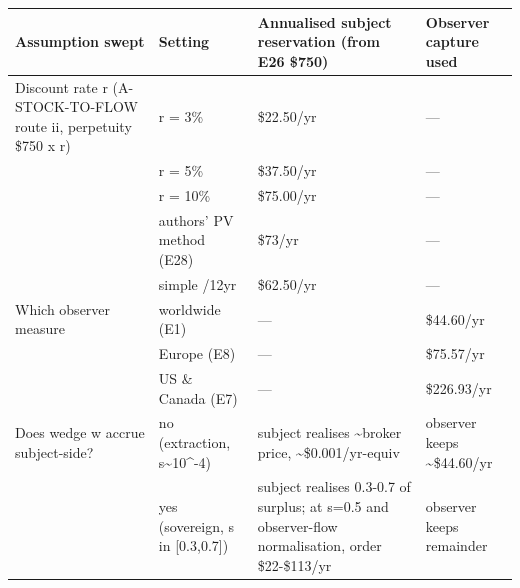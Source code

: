 \documentclass[
  11pt,
]{article}
\newcounter{none} %
\begin{document}
{\def\LTcaptype{none} %
\begin{longtable}[]{@{}
  >{\raggedright\arraybackslash}p{}
  >{\raggedright\arraybackslash}p{}
  >{\raggedright\arraybackslash}p{}
  >{\raggedright\arraybackslash}p{}@{}}
\toprule\noalign{}
\begin{minipage}[b]{\linewidth}\raggedright
Assumption swept
\end{minipage} & \begin{minipage}[b]{\linewidth}\raggedright
Setting
\end{minipage} & \begin{minipage}[b]{\linewidth}\raggedright
Annualised subject reservation (from E26 \$750)
\end{minipage} & \begin{minipage}[b]{\linewidth}\raggedright
Observer capture used
\end{minipage} \\
\midrule\noalign{}
\endhead
\bottomrule\noalign{}
\endlastfoot
Discount rate r (A-STOCK-TO-FLOW route ii, perpetuity \$750 x r) & r =
3\% & \$22.50/yr & --- \\
& r = 5\% & \$37.50/yr & --- \\
& r = 10\% & \$75.00/yr & --- \\
& authors' PV method (E28) & \$73/yr & --- \\
& simple /12yr & \$62.50/yr & --- \\
Which observer measure & worldwide (E1) & --- & \$44.60/yr \\
& Europe (E8) & --- & \$75.57/yr \\
& US \& Canada (E7) & --- & \$226.93/yr \\
Does wedge w accrue subject-side? & no (extraction,
s\textasciitilde10\^{}-4) & subject realises \textasciitilde broker
price, \textasciitilde\$0.001/yr-equiv & observer keeps
\textasciitilde\$44.60/yr \\
& yes (sovereign, s in {[}0.3,0.7{]}) & subject realises 0.3-0.7 of
surplus; at s=0.5 and observer-flow normalisation, order \$22-\$113/yr &
observer keeps remainder \\
\end{longtable}
}
\end{document}
